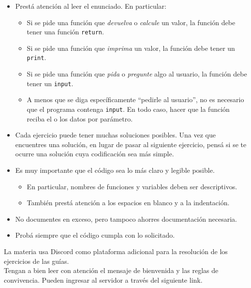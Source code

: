\documentclass[
  letterpaper,
  DIV=11,
  numbers=noendperiod]{scrreprt}
\providecommand{\tightlist}{%
  \setlength{\itemsep}{0pt}\setlength{\parskip}{0pt}}\usepackage{longtable,booktabs,array}
\begin{document}
\begin{itemize}
\tightlist
\item
  Prestá atención al leer el enunciado. En particular:

  \begin{itemize}
  \tightlist
  \item
    Si se pide una función que \emph{devuelva} o \emph{calcule} un
    valor, la función debe tener una función \texttt{return}.
  \item
    Si se pide una función que \emph{imprima} un valor, la función debe
    tener un \texttt{print}.
  \item
    Si se pide una función que \emph{pida} o \emph{pregunte} algo al
    usuario, la función debe tener un \texttt{input}.
  \item
    A menos que se diga específicamente ``pedirle al usuario'', no es
    necesario que el programa contenga \texttt{input}. En todo caso,
    hacer que la función reciba el o los datos por parámetro.
  \end{itemize}
\item
  Cada ejercicio puede tener muchas soluciones posibles. Una vez que
  encuentres una solución, en lugar de pasar al siguiente ejercicio,
  pensá si se te ocurre una solución cuya codificación sea más simple.
\item
  Es muy importante que el código sea lo más claro y legible posible.

  \begin{itemize}
  \tightlist
  \item
    En particular, nombres de funciones y variables deben ser
    descriptivos.
  \item
    También prestá atención a los espacios en blanco y a la indentación.
  \end{itemize}
\item
  No documentes en exceso, pero tampoco ahorres documentación necesaria.
\item
  Probá siempre que el código cumpla con lo solicitado.
\end{itemize}

\begin{tcolorbox}[enhanced jigsaw, opacitybacktitle=0.6, toptitle=1mm, toprule=.15mm, arc=.35mm, breakable, bottomrule=.15mm, opacityback=0, leftrule=.75mm, rightrule=.15mm, title=\textcolor{quarto-callout-note-color}{\faInfo}\hspace{0.5em}{Discord}, left=2mm, bottomtitle=1mm, colframe=quarto-callout-note-color-frame, colback=white, titlerule=0mm, coltitle=black, colbacktitle=quarto-callout-note-color!10!white]

La materia usa Discord como plataforma adicional para la resolución de
los ejercicios de las guías.\\
Tengan a bien leer con atención el mensaje de bienvenida y las reglas de
convivencia. Pueden ingresar al servidor a través del siguiente link.

\end{tcolorbox}
\end{document}

